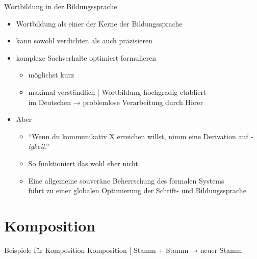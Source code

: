 \begin{frame}
  {Wortbildung in der Bildungssprache}
  \pause
  \begin{itemize}[<+->]
    \item Wortbildung als einer der Kerne der Bildungssprache
    \item kann sowohl \alert{verdichten} als auch \alert{präzisieren}
    \Halbzeile
    \item komplexe Sachverhalte \alert{optimiert} formulieren
      \begin{itemize}[<+->]
        \item möglichst kurz
        \item maximal verständlich | Wortbildung hochgradig etabliert\\
          im Deutschen → problemlose Verarbeitung durch Hörer
      \end{itemize}
      \Halbzeile
    \item Aber 
      \Halbzeile
      \begin{itemize}[<+->]
        \item "`Wenn du kommunikativ X erreichen willst, nimm eine Derivation auf \textit{-igkeit}."'
        \item So funktioniert das wohl eher nicht.
        \item Eine allgemeine souveräne \alert{Beherrschung des formalen Systems}\\
          führt zu einer globalen \alert{Optimierung der Schrift- und Bildungssprache}
      \end{itemize}
  \end{itemize}
\end{frame}


\section{Komposition}

\begin{frame}
  {Beispiele für Komposition}
  \onslide<+->
  Komposition | \alert{Stamm + Stamm → neuer Stamm}
  \Halbzeile
  \onslide<+->
  \begin{exe}
    \ex
    \begin{xlist}
      \onslide<+->
      \onslide<+->
      \onslide<+->
      \onslide<+->
      \onslide<+->
      \onslide<+->
      \onslide<+->
      \onslide<+->
    \end{xlist}
  \end{exe}
\end{frame}

